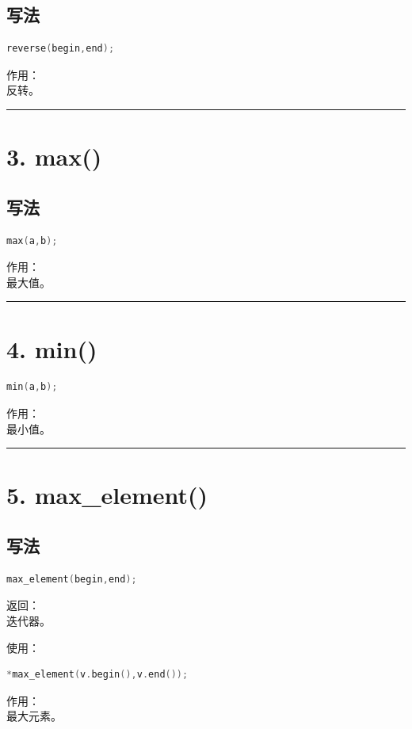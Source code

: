 \documentclass[10pt,twocolumn]{extarticle}
\begin{document}
\subsection{写法}
\begin{lstlisting}[language=C++]
reverse(begin,end);
\end{lstlisting}
作用：\\
反转。

\noindent\rule{\linewidth}{0.4pt}

\section{3. max()}

\subsection{写法}
\begin{lstlisting}[language=C++]
max(a,b);
\end{lstlisting}
作用：\\
最大值。

\noindent\rule{\linewidth}{0.4pt}

\section{4. min()}
\begin{lstlisting}[language=C++]
min(a,b);
\end{lstlisting}
作用：\\
最小值。

\noindent\rule{\linewidth}{0.4pt}

\section{5. max\_element()}

\subsection{写法}
\begin{lstlisting}[language=C++]
max_element(begin,end);
\end{lstlisting}
返回：\\
迭代器。

使用：
\begin{lstlisting}[language=C++]
*max_element(v.begin(),v.end());
\end{lstlisting}
作用：\\
最大元素。
\end{document}
